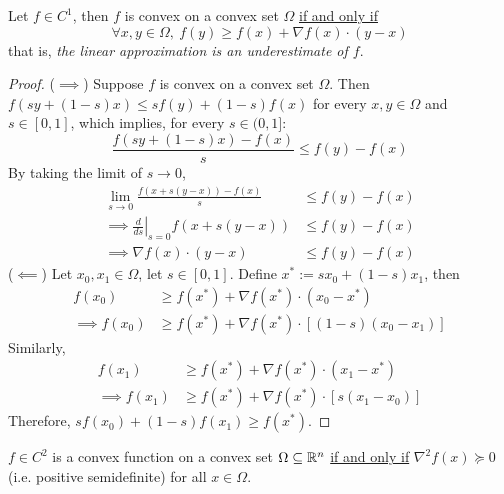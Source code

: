 \documentclass{article}
\begin{document}
    \begin{theorem}
        Let $f \in C^1$, then $f$ is convex on a convex set $\Omega$ \ul{if and only if}
        \begin{equation}
            \forall x, y \in \Omega,\ f(y) \geq f(x) + \nabla f(x) \cdot (y - x)
        \end{equation}
        that is, \emph{the linear approximation is an underestimate of $f$}.
    \end{theorem}
    \begin{proof}
        ($\implies$) Suppose $f$ is convex on a convex set $\Omega$. Then $f(sy + (1-s) x) \leq sf(y) + (1-s)f(x)$ for every $x, y \in \Omega$ and $s \in [0, 1]$, which implies, for every $s \in (0, 1]$:
        \begin{equation}
            \frac{f(sy + (1-s) x) - f(x)}{s} \leq f(y) - f(x)
        \end{equation}
        By taking the limit of $s \to 0$,
        \begin{align}
            \lim_{s \to 0} \frac{f(x + s(y-x)) - f(x)}{s} &\leq f(y) - f(x) \\
            \implies \left.\frac{d}{ds}\right\vert_{s=0} f(x + s(y-x)) &\leq f(y) - f(x) \\
            \implies \nabla f(x) \cdot (y-x) &\leq f(y) - f(x)
        \end{align}
        ($\impliedby$) Let $x_0, x_1 \in \Omega$, let $s \in [0, 1]$. Define $x^* := s x_0 + (1-s) x_1$, then 
        \begin{align}
        	f(x_0) &\geq f(x^*) + \nabla f(x^*) \cdot (x_0 - x^*) \\
        	\implies f(x_0) &\geq f(x^*) + \nabla f(x^*) \cdot [(1-s)(x_0 - x_1)]
        \end{align}
        Similarly,
        \begin{align}
        	f(x_1) &\geq f(x^*) + \nabla f(x^*) \cdot (x_1 - x^*) \\
        	\implies f(x_1) &\geq f(x^*) + \nabla f(x^*) \cdot [s(x_1 - x_0)]
        \end{align}
        Therefore, $sf(x_0) + (1-s)f(x_1) \geq f(x^*)$.
    \end{proof}
    
    \begin{theorem}
        $f \in C^2$ is a convex function on a convex set $\Omega \subseteq \mathbb{R}^n$ \ul{if and only if} $\nabla^2 f(x) \succcurlyeq 0$ (i.e. positive semidefinite) for all $x \in \Omega$.
    \end{theorem}
    
\end{document}
